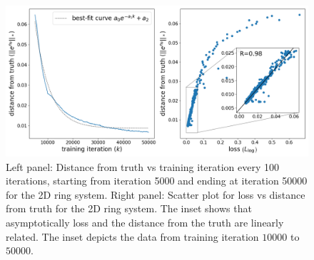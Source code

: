 \begin{figure}[!ht]
    \centering\includegraphics[scale=0.4]{steady-fp/plots/steady-plots-2D-distance.png}
    \caption{Left panel: Distance from truth vs training iteration every 100 iterations, starting from iteration 5000 and ending at iteration 50000 for the 2D ring system. Right panel: Scatter plot for loss vs distance from truth for the 2D ring system. The inset shows that asymptotically loss and the distance from the truth are linearly related. The inset depicts the data from training iteration $10000$ to $50000$.}
    \label{fig:dist-loss--steady-fp}
\end{figure}